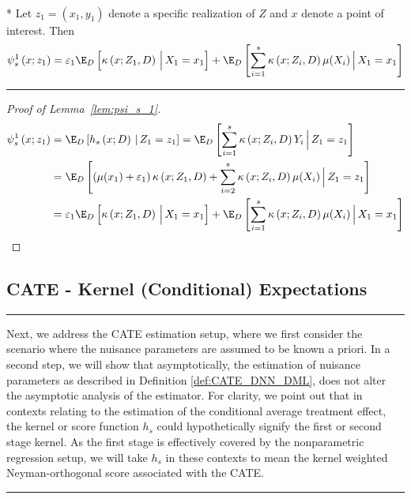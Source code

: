 \begin{lem}\label{lem:psi_s_1}\mbox{}\\*
	Let $z_1 = (x_1, y_1)$ denote a specific realization of $Z$ and $x$ denote a point of interest.
	Then
	\begin{equation}
		\psi_{s}^{1}\left(x; z_1\right)
		= \varepsilon_1 \E_D\left[\kappa\left(x; Z_1, D\right)\, \Big| \, X_1 = x_1 \right]
		+ \E_{D}\left[\sum_{i = 1}^{s} \kappa\left(x; Z_{i}, D\right) \mu(X_{i})\, \Big| \, X_1 = x_1 \right]
	\end{equation}
\end{lem}
\hrule
\begin{proof}[Proof of Lemma~\ref{lem:psi_s_1}]
	\begin{equation}
		\begin{aligned}
			\psi_{s}^{1}\left(x; z_1\right)
			 & = \E_{D}\left[h_{s}\left(x; D\right) \, | \, Z_1 = z_1 \right]
			= \E_{D}\left[\sum_{i = 1}^{s} \kappa\left(x; Z_{i}, D\right) Y_{i} \, \Big| \, Z_1 = z_1 \right]  \\
			 & = \E_{D}\left[\left(\mu(x_1) + \varepsilon_1\right)\kappa\left(x; Z_1, D\right)
			+ \sum_{i = 2}^{s} \kappa\left(x; Z_{i}, D\right) \mu(X_{i})\, \Big| \, Z_1 = z_1 \right] \\
			 & = \varepsilon_1 \E_D\left[\kappa\left(x; Z_1, D\right)\, \Big| \, X_1 = x_1 \right]
			+ \E_{D}\left[\sum_{i = 1}^{s} \kappa\left(x; Z_{i}, D\right) \mu(X_{i})\, \Big| \, X_1 = x_1 \right]
		\end{aligned}
	\end{equation}
\end{proof}

\newpage
\subsection{CATE - Kernel (Conditional) Expectations}
\hrule
Next, we address the CATE estimation setup, where we first consider the scenario where the nuisance parameters are assumed to be known a priori.
In a second step, we will show that asymptotically, the estimation of nuisance parameters as described in Definition \ref{def:CATE_DNN_DML}, does not alter the asymptotic analysis of the estimator.
For clarity, we point out that in contexts relating to the estimation of the conditional average treatment effect, the kernel or score function $h_s$ could hypothetically signify the first or second stage kernel.
As the first stage is effectively covered by the nonparametric regression setup, we will take $h_s$ in these contexts to mean the kernel weighted Neyman-orthogonal score associated with the CATE.
\vspace{0.5cm}
\hrule

